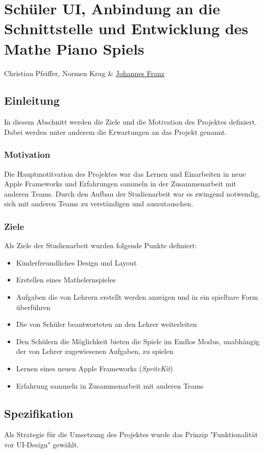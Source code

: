 \chapter{Schüler UI, Anbindung an die Schnittstelle und Entwicklung des Mathe Piano Spiels}
Christian Pfeiffer, Normen Krug \& \href{mailto:jofranz90@gmail.com?subject=Swift-Studienarbeit}{Johannes Franz}



\section{Einleitung}
In diesem Abschnitt werden die Ziele und die Motivation des Projektes definiert. Dabei werden unter anderem die Erwartungen an das Projekt genannt.

\subsection{Motivation}
Die Hauptmotitvation des Projektes war das Lernen und Einarbeiten in neue Apple Frameworks und Erfahrungen sammeln in der Zusammenarbeit mit anderen Teams. Durch den Aufbau der  Studienarbeit war es zwingend notwendig, sich mit anderen Teams zu verständigen und auszutauschen.  

\subsection{Ziele}
Als Ziele der Studienarbeit wurden folgende Punkte definiert: 
\begin{itemize}
\item Kinderfreundliches Design und Layout
\item Erstellen eines Mathelernspieles 
\item Aufgaben die von Lehrern erstellt werden anzeigen und in ein spielbare Form überführen
\item Die von Schüler beantworteten an den Lehrer weiterleiten
\item Den Schülern die Möglichkeit bieten die Spiele im Endlos Modus, unabhängig der von Lehrer zugewiesenen Aufgaben, zu spielen
\item Lernen eines neuen Apple Frameworks (\textit{SpriteKit})
\item Erfahrung sammeln in Zusammenarbeit mit anderen Teams
\end{itemize}
\section{Spezifikation}
Als Strategie für die Umsetzung des Projektes wurde das Prinzip "Funktionalität vor UI-Design" gewählt.
